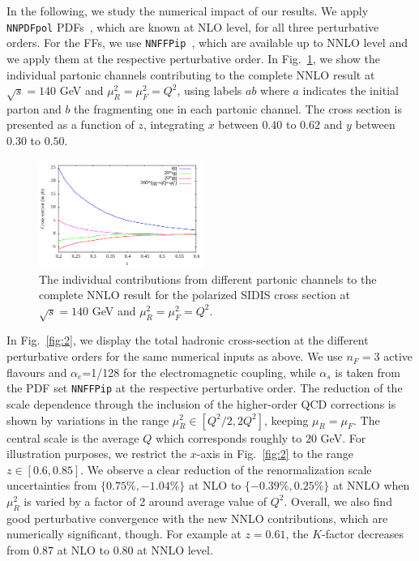 \documentclass[%
 twocolumn,
 superscriptaddress,
 preprintnumbers,
 nofootinbib,
 amsmath,amssymb,
 aps,
 prl,
]{revtex4}
\begin{document}
{In the following, we study the numerical impact of our results.
We apply \texttt{NNPDFpol} PDFs~\cite{NNPDF:2014otw}, 
which are known at NLO level, for all three perturbative orders.
For the FFs, we use \texttt{NNFFPip}~\cite{Bertone:2017tyb}, which are available up to NNLO level and we apply them at the respective perturbative order.
%
In Fig.~\ref{fig:1}, we show the individual partonic channels contributing to the complete NNLO result at $\sqrt{s}=140$ GeV and 
$\mu_R^2 = \mu_F^2 = Q^2$, using labels $ab$ where $a$ indicates the initial parton and $b$ the fragmenting one in each partonic channel.
The cross section is presented as a function of $z$, integrating $x$ between $0.40$ to $0.62$ and $y$ between $0.30$ to $0.50$.
%
\begin{figure}[ht]
\includegraphics[width=0.48\textwidth]{nnlo_channels.png}
\caption{The individual contributions from different partonic channels to the 
complete NNLO result for the polarized SIDIS cross section at $\sqrt{s}=140$ GeV and $\mu_R^2 = \mu_F^2 = Q^2$.}
\label{fig:1}
\end{figure}

In Fig.~\ref{fig:2}, we display the total hadronic cross-section at the different perturbative orders for the same numerical inputs as above. 
We use $n_F=3$ active flavours and $\alpha_e$=1/128 
for the electromagnetic coupling, while $\alpha_s$ is taken from the PDF set \texttt{NNFFPip} at the respective perturbative order.
The reduction of the scale dependence through the inclusion of the higher-order QCD corrections is shown by variations in the range $\mu_R^2  \in [Q^2/2, 2 Q^2]$, keeping $\mu_R =\mu_F$.
The central scale is the average $Q$ which corresponds roughly to $20$ GeV.
For illustration purposes, we restrict the $x$-axis in Fig.~\ref{fig:2} to the range $z \in [0.6, 0.85]$.
%
We observe a clear reduction of the renormalization scale uncertainties from $\{ 0.75\%, -1.04\% \}$ at NLO to $\{ -0.39\%, 0.25\% \}$ at NNLO when $\mu_R^2$ is varied by a factor of 2 around average value of $Q^2$.
Overall, we also find good perturbative convergence with the new NNLO contributions, which are numerically significant, though.
For example at $z=0.61$, the $K$-factor decreases from $0.87$ at NLO
to $0.80$ at NNLO level.
%


}
\end{document}
